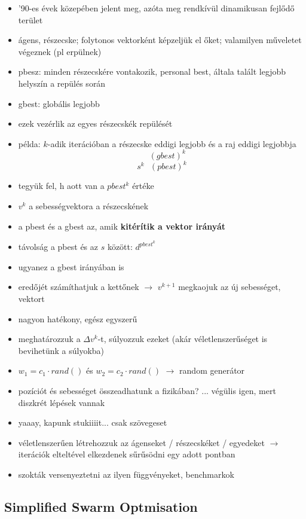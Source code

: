 \documentclass[a4paper, 11pt]{article}
\begin{document}
\begin{itemize}
	\item '90-es évek közepében jelent meg, azóta meg rendkívül dinamikusan fejlődő terület
	\item ágens, részecske; folytonos vektorként képzeljük el őket; valamilyen műveletet végeznek (pl erpülnek)
	\item pbesz: minden részecskére vontakozik, personal best, általa talált legjobb helyszín a repülés során
	\item gbest: globális legjobb
	\item ezek vezérlik az egyes részecskék repülését
	\item példa: $k$-adik iterációban a részecske eddigi legjobb és a raj eddigi legjobbja
	\[ ~~~~~~ (gbest)^k \]
	\[ s^k ~~~ (pbest)^k \]
	\item tegyük fel, h aott van a $pbest^k$ értéke
	\item $v^k$ a sebességvektora a részecskének
	\item a pbest és a gbest az, amik \textbf{kitérítik a vektor irányát}
	\item távolság a pbest és az $s$ között: $d^{pbest^k}$
	\item ugyanez a gbest irányában is
	\item eredőjét számíthatjuk a kettőnek $\to$ $v^{k+1}$ megkaojuk az új sebességet, vektort
	\item nagyon hatékony, egész egyszerű
	\item meghatározzuk a $\Delta v^k$-t, súlyozzuk ezeket (akár véletlenszerűséget is bevihetünk a súlyokba)
	\item $w_1 = c_1 \cdot rand()$ és $w_2 = c_2 \cdot rand()$ $\to$ random generátor
	\item pozíciót és sebességet összeadhatunk a fizikában? ... végülis igen, mert diszkrét lépések vannak
	\item yaaay, kapunk stukiiiit... csak szövegeset
	\item véletlenszerűen létrehozzuk az ágenseket / részecskéket / egyedeket $\to$ iterációk elteltével elkezdenek sűrűsödni egy adott pontban
	\item szokták versenyeztetni az ilyen függvényeket, benchmarkok
\end{itemize}

\subsection{Simplified Swarm Optmisation}
\end{document}
